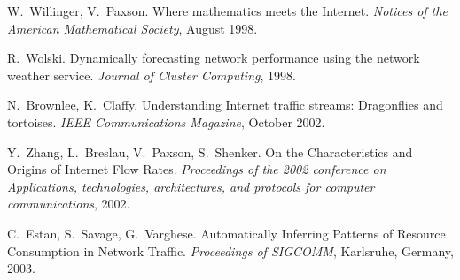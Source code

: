 \begin{thebibliography}{99}
W.~Willinger, V.~Paxson.
Where mathematics meets the Internet.
\textit{Notices of the American Mathematical Society}, August 1998.

R.~Wolski.
Dynamically forecasting network performance using the network weather service.
\textit{Journal of Cluster Computing}, 1998.


N.~Brownlee, K.~Claffy.
Understanding Internet traffic streams: Dragonflies and tortoises.
\textit{IEEE Communications Magazine}, October 2002.



Y.~Zhang, L.~Breslau, V.~Paxson, S.~Shenker.
On the Characteristics and Origins of Internet Flow Rates.
\textit{Proceedings of the 2002 conference on Applications, technologies, architectures, and protocols for computer communications}, 2002.

C.~Estan, S.~Savage, G.~Varghese.
Automatically Inferring Patterns of Resource Consumption in Network Traffic.
\textit{Proceedings of SIGCOMM}, Karlsruhe, Germany, 2003.





\end{thebibliography}

